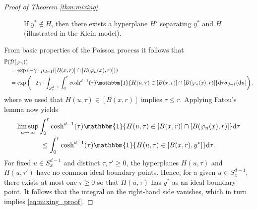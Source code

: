 \documentclass[12pt,a4paper]{article}
\theoremstyle{definition}
\renewcommand{\P}{\mathbb{P}}
\newcommand{\dint}{{\rm d}}
\newcommand{\one}{\mathbbm{1}}
\begin{document}
\begin{proof}[Proof of Theorem \ref{thm:mixing}]
\begin{figure}[ht]
\centering
{}
\caption{If \(y^* \notin H\), then there exists a hyperplane \(H'\) separating \(y^*\) and \(H\) (illustrated in the Klein model).
\label{fig:sketch_ergodic_proof}}
\end{figure}
    
    From basic properties of the Poisson process it follows that
    \begin{align*}
        &\P(\mathcal{D}(\varphi_n))\\
            &\quad= \exp\left(-\gamma \cdot \mu_{d-1}([B(x,r)] \cap [B(\varphi_n(x),r)])\right)\\
            &\quad= \exp\left(-2\gamma \cdot \int_{S_x^{d-1}} \int_0^r \cosh^{d-1}(\tau)
            \one\{H(u,\tau) \in [B(x,r)] \cap [B(\varphi_n(x),r)]\} \dint\tau \sigma_{d-1}(\dint u) \right),
    \end{align*}
    where we used that \(H(u,\tau) \in [B(x,r)]\) implies \(\tau \leq r\).
    Applying Fatou's lemma now yields
    \begin{multline*}
        \limsup_{n\to\infty}\int_0^r \cosh^{d-1}(\tau)
            \one\{H(u,\tau) \in [B(x,r)] \cap [B(\varphi_n(x),r)]\} \dint\tau \\ \leq
            \int_0^r \cosh^{d-1}(\tau)
            \one\{H(u,\tau) \in [B(x,r),y^*]\} \dint\tau.
    \end{multline*}
    For fixed \(u \in S_x^{d-1}\) and distinct \(\tau,\tau'\geq 0\), the hyperplanes \(H(u,\tau)\) and \(H(u,\tau')\) have no common ideal boundary points.
    Hence, for a given \(u\in S_x^{d-1}\), there exists at most one \(\tau \geq 0\) so that \(H(u,\tau)\) has \(y^*\) as an ideal boundary point.
    It follows that the integral on the right-hand side vanishes, which in turn implies \eqref{eq:mixing_proof}.
\end{proof}
\end{document}
